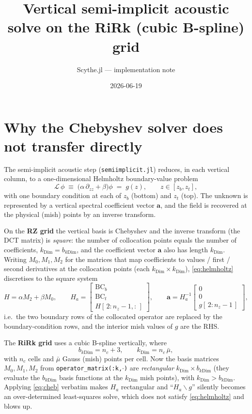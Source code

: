 \documentclass[11pt]{article}
\title{Vertical semi-implicit acoustic solve on the RiRk (cubic B-spline) grid}
\author{Scythe.jl --- implementation note}
\date{2026-06-19}
\begin{document}
\maketitle

\section{Why the Chebyshev solver does not transfer directly}

The semi-implicit acoustic step (\texttt{semiimplicit.jl}) reduces, in each
vertical column, to a one-dimensional Helmholtz boundary-value problem
\begin{equation}
  \mathcal{L}\,\phi \;\equiv\; \bigl(\alpha\,\partial_{zz} + \beta\bigr)\phi \;=\; g(z),
  \qquad z\in[z_b,z_t],
  \label{eq:helmholtz}
\end{equation}
with one boundary condition at each of $z_b$ (bottom) and $z_t$ (top). The
unknown is represented by a vertical spectral coefficient vector $\mathbf{a}$,
and the field is recovered at the physical (mish) points by an inverse transform.

On the \textbf{RZ grid} the vertical basis is Chebyshev and the inverse transform
(the DCT matrix) is \emph{square}: the number of collocation points equals the
number of coefficients, $k_{\mathrm{Dim}} = b_{k\mathrm{Dim}}$, and the
coefficient vector $\mathbf{a}$ also has length $k_{\mathrm{Dim}}$. Writing
$M_0,M_1,M_2$ for the matrices that map coefficients to values / first / second
derivatives at the collocation points (each $k_{\mathrm{Dim}}\times
k_{\mathrm{Dim}}$), \eqref{eq:helmholtz} discretises to the square system
\begin{equation}
  H = \alpha M_2 + \beta M_0,
  \qquad
  H_a =
  \begin{bmatrix} \mathrm{BC}_b \\ \mathrm{BC}_t \\ H[\,2{:}n_z\!-\!1,:\,] \end{bmatrix},
  \qquad
  \mathbf{a} = H_a^{-1}
  \begin{bmatrix} 0 \\ 0 \\ g[\,2{:}n_z\!-\!1\,] \end{bmatrix},
  \label{eq:cheb}
\end{equation}
i.e.\ the two boundary rows of the collocated operator are replaced by the
boundary-condition rows, and the interior mish values of $g$ are the RHS.

The \textbf{RiRk grid} uses a cubic B-spline vertically, where
\begin{equation}
  b_{k\mathrm{Dim}} = n_c + 3, \qquad k_{\mathrm{Dim}} = n_c\,\bar{\mu},
\end{equation}
with $n_c$ cells and $\bar\mu$ Gauss (mish) points per cell. Now the basis
matrices $M_0,M_1,M_2$ from \texttt{operator\_matrix(:k,$\cdot$)} are
\emph{rectangular} $k_{\mathrm{Dim}}\times b_{k\mathrm{Dim}}$ (they evaluate the
$b_{k\mathrm{Dim}}$ basis functions at the $k_{\mathrm{Dim}}$ mish points), with
$k_{\mathrm{Dim}}>b_{k\mathrm{Dim}}$. Applying \eqref{eq:cheb} verbatim makes
$H_a$ rectangular and ``$H_a\backslash g$'' silently becomes an over-determined
least-squares solve, which does not satisfy \eqref{eq:helmholtz} and blows up.
\end{document}
